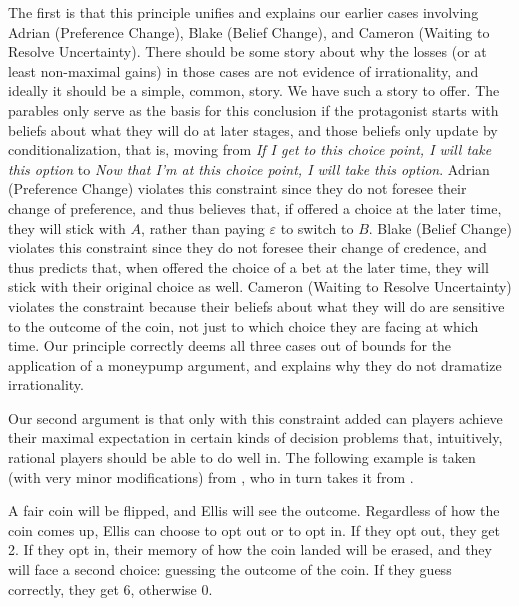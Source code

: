 \documentclass[
  11pt,
  letterpaper]{article}
\begin{document}
The first is that this principle unifies and explains our earlier cases involving Adrian (Preference Change), Blake (Belief Change), and Cameron (Waiting to Resolve Uncertainty). There should be some story about why the losses (or at least non-maximal gains) in those cases are not evidence of irrationality, and ideally it should be a simple, common, story. We have such a story to offer. The parables only serve as the basis for this conclusion if the protagonist starts with beliefs about what they will do at later stages, and those beliefs only update by conditionalization, that is, moving from \emph{If I get to this choice point, I will take this option} to \emph{Now that I'm at this choice point, I will take this option}. Adrian (Preference Change) violates this constraint since they do not foresee their change of preference, and thus believes that, if offered a choice at the later time, they will stick with $A$, rather than paying $\varepsilon$ to switch to $B$. Blake (Belief Change) violates this constraint since they do not foresee their change of credence, and thus predicts that, when offered the choice of a bet at the later time, they will stick with their original choice as well. Cameron (Waiting to Resolve Uncertainty) violates the constraint because their beliefs about what they will do are sensitive to the outcome of the coin, not just to which choice they are facing at which time. Our principle correctly deems all three cases out of bounds for the application of a moneypump argument, and explains why they do not dramatize irrationality.

Our second argument is that only with this constraint added can players achieve their maximal expectation in certain kinds of decision problems that, intuitively, rational players should be able to do well in. The following example is taken (with very minor modifications) from \citet{Stalnaker1999}, who in turn takes it from \citet{PiccioneRubinstein1997}.

A fair coin will be flipped, and Ellis will see the outcome. Regardless of how the coin comes up, Ellis can choose to opt out or to opt in. If they opt out, they get 2. If they opt in, their memory of how the coin landed will be erased, and they will face a second choice: guessing the outcome of the coin. If they guess correctly, they get 6, otherwise 0.
\end{document}
